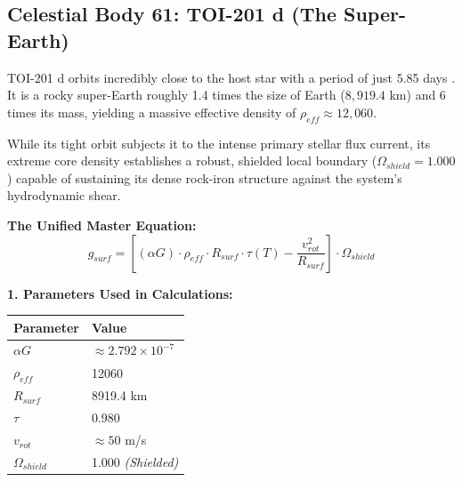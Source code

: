 \documentclass[11pt, a4paper]{article}
\begin{document}
\clearpage
\subsection{Celestial Body 61: TOI-201 d (The Super-Earth)}
  TOI-201 d orbits incredibly close to the host star with a period of just 5.85 days \cite{hobson2021}. It is a rocky super-Earth roughly 1.4 times the size of Earth ($8,919.4$ km) and 6 times its mass, yielding a massive effective density of $\rho_{eff} \approx 12,060$. 

  While its tight orbit subjects it to the intense primary stellar flux current, its extreme core density establishes a robust, shielded local boundary ($\Omega_{shield} = 1.000$) capable of sustaining its dense rock-iron structure against the system's hydrodynamic shear. 

  \vspace{0.5em}
  \noindent \textbf{The Unified Master Equation:}
  $$ g_{surf} = \left[ (\alpha G) \cdot \rho_{eff} \cdot R_{surf} \cdot \tau(T) - \frac{v_{rot}^2}{R_{surf}} \right] \cdot \Omega_{shield} $$

  \vspace{0.5em}
  \noindent \textbf{1. Parameters Used in Calculations:} \\[0.5em]
  \begingroup
  \renewcommand{\arraystretch}{1.3}
  \hspace*{2em}
  \begin{tabular}{|l|l|}
    \hline
    \textbf{Parameter} & \textbf{Value} \\ \hline
    $\alpha G$ & $\approx 2.792 \times 10^{-7}$ \\ \hline
    $\rho_{eff}$ & 12060 \\ \hline
    $R_{surf}$ & 8919.4 km \\ \hline
    $\tau$ & 0.980 \\ \hline
    $v_{rot}$ & $\approx 50$ m/s \\ \hline
    $\Omega_{shield}$ & 1.000 \textit{(Shielded)} \\ \hline
  \end{tabular}
  \endgroup
\end{document}
